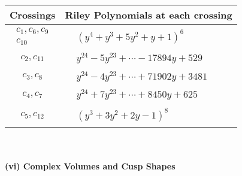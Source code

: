 \documentclass[1p]{elsarticle_modified}
\theoremstyle{definition}
\begin{document}
\begin{tabular}{m{50pt}|m{274pt}}
Crossings & \hspace{64pt}Riley Polynomials at each crossing \\
\hline $$\begin{aligned}c_{1},c_{6},c_{9}\\c_{10}\end{aligned}$$&$\begin{aligned}
&(y^4+y^3+5 y^2+y+1)^6
\end{aligned}$\\
\hline $$\begin{aligned}c_{2},c_{11}\end{aligned}$$&$\begin{aligned}
&y^{24}-5 y^{23}+\cdots-17894 y+529
\end{aligned}$\\
\hline $$\begin{aligned}c_{3},c_{8}\end{aligned}$$&$\begin{aligned}
&y^{24}-4 y^{23}+\cdots+71902 y+3481
\end{aligned}$\\
\hline $$\begin{aligned}c_{4},c_{7}\end{aligned}$$&$\begin{aligned}
&y^{24}+7 y^{23}+\cdots+8450 y+625
\end{aligned}$\\
\hline $$\begin{aligned}c_{5},c_{12}\end{aligned}$$&$\begin{aligned}
&(y^3+3 y^2+2 y-1)^8
\end{aligned}$\\
\hline
\end{tabular}\\~\\
\newpage\flushleft \textbf{(vi) Complex Volumes and Cusp Shapes}
\end{document}
